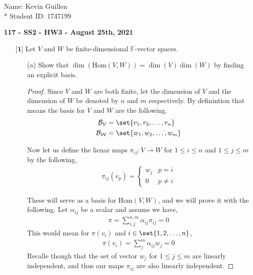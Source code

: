\documentclass[12pt]{article}
\DeclarePairedDelimiter\set\{\}
\begin{document}
\begin{flushright}
    Name: Kevin Guillen \\*
    Student ID: 1747199
\end{flushright}
\begin{center}
    {\bf 117 - SS2 - HW3 - August 25th, 2021}
\end{center}

\begin{itemize}
    \item[$\textbf{[1]}$]
    Let $V$ and $W$ be finite-dimensional $\mathbb{F}$-vector spaces.
    \begin{itemize}
    
    \vspace{.3cm}
    \item[(a)]
    Show that $\dim(\text{Hom}(V,W)) = \dim(V)\dim(W)$ by finding an explicit basis.

    \begin{proof}
        Since $V$ and $W$ are both finite, let the dimension of $V$ and the dimension of $W$ be denoted by $n$ and $m$ respectively. By definintion that means the basis for $V$ and $W$ are the following.
        \begin{align*}
            \mathcal{B_V} &= \set{v_1, v_2, \dots, v_n} \\
            \mathcal{B_W} &= \set{w_1, w_2, \dots, w_m}
        \end{align*} 

        Now let us define the lienar maps $\pi_{ij}: V \to W$ for $1\leq i \leq n$ and $1 \leq j \leq m$ by the following,
        \begin{align*}
            \pi_{ij}(v_p)= \begin{cases}w_j & p = i \\ 0 & p\neq i \end{cases}
        \end{align*}

        These will serve as a basis for Hom$(V,W)$, and we will prove it with the following. Let $\alpha_{ij}$ be a scalar and assume we have,
        \begin{align*}
            \pi = \sum_{i,j}^{n,m} \alpha_{ij} \pi_{ij} = 0 
        \end{align*}
        This would mean for $\pi(v_i)$ and $i \in \set{1, 2, \dots, n}$,
        \begin{align*}
            \pi(v_i) = \sum_{j}^m \alpha_{ij} w_j = 0 
        \end{align*}
        Recalle though that the set of vector $w_j$ for $1 \leq j \leq m$ are linearly independent, and thus our maps $\pi_{ij}$ are also linearly independent. 


\end{proof}
\end{itemize}
\end{itemize}
\end{document}
